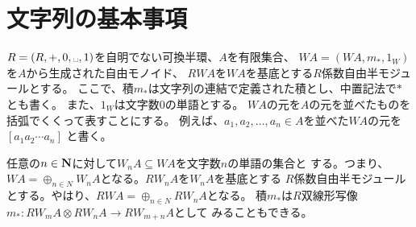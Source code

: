 \section{文字列の基本事項}\label{s1:文字列の基本事項} %
	$R=(R,+,0,\myspace,1)$を自明でない可換半環、$A$を有限集合、
	$WA=(WA,m_*,1_W)$を$A$から生成された自由モノイド、
	$RWA$を$WA$を基底とする$R$係数自由半モジュールとする。
	ここで、積$m_*$は文字列の連結で定義された積とし、中置記法で$*$とも書く。
	また、$1_W$は文字数$0$の単語とする。
	$WA$の元を$A$の元を並べたものを括弧でくくって表すことにする。
	例えば、$a_1,a_2,\dots, a_n\in A$を並べた$WA$の元を$[a_1a_2\cdots a_n]$
	と書く。
	
	任意の$n\in{\mathbf{N}}$に対して$W_nA\subseteq WA$を文字数$n$の単語の集合と
	する。つまり、$WA=\oplus_{n\in N}W_nA$となる。$RW_nA$を$W_nA$を基底とする
	$R$係数自由半モジュールとする。やはり、$RWA=\oplus_{n\in N}RW_nA$となる。
	積$m_*$は$R$双線形写像$m_*:RW_mA\otimes RW_nA\to RW_{m+n}A$として
	みることもできる。

